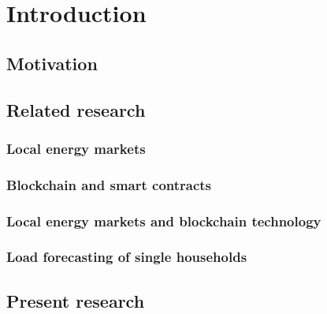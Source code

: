 
\section{Introduction}\label{Sec:Intro}




\subsection{Motivation}\label{Sec:Intro;Subsec:Motivation}




\subsection{Related research}\label{Sec:Intro;Subsec:Related}



\subsubsection{Local energy markets}



\subsubsection{Blockchain and smart contracts}



\subsubsection{Local energy markets and blockchain technology}



\subsubsection{Load forecasting of single households}



\subsection{Present research}\label{Sec:Intro;Subsec:Present}



